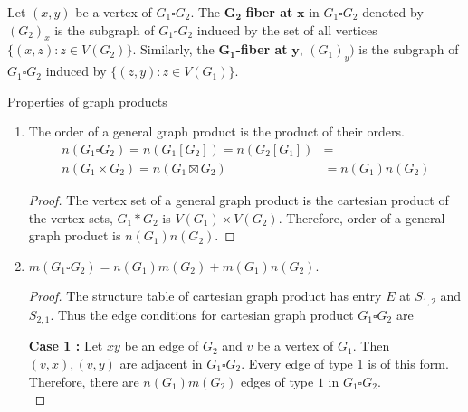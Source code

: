 \begin{definition}
	Let $(x,y)$ be a vertex of $G_1 \square G_2$. The $\mathbf{G_2}$ \textbf{fiber at} $\mathbf{x}$ in $G_1 \square G_2$ denoted by $(G_2)_x$ is the subgraph of $G_1 \square G_2$ induced by the set of all vertices $\{ (x,z) : z \in V(G_2) \}$. Similarly, the $\mathbf{G_1}$\textbf{-fiber at} $\mathbf{y}$, $(G_1)_y)$ is the subgraph of $G_1 \square G_2$ induced by $\{ (z,y) : z \in V(G_1) \}$.
\end{definition}


\begin{exercise}Properties of graph products
\begin{enumerate}
	\item The order of a general graph product is the product of their orders.
	\begin{align*}
		n(G_1 \square G_2) 
		= n(G_1[G_2]) = n(G_2[G_1]) & =\\
		n(G_1 \times G_2) = n(G_1 \boxtimes G_2) & = n(G_1) n(G_2)
		\end{align*}
	\begin{proof}
		The vertex set of a general graph product is the cartesian product of the vertex sets, $G_1 \ast G_2$ is $V(G_1) \times V(G_2)$. Therefore, order of a general graph product is $n(G_1)n(G_2)$.
	\end{proof}
	\item $m(G_1 \square G_2) = n(G_1) m(G_2) + m(G_1) n(G_2)$.
	\begin{proof}
		The structure table of cartesian graph product has entry $E$ at $S_{1,2}$ and $S_{2,1}$.
		Thus the edge conditions for cartesian graph product $G_1 \square G_2$ are

		\textbf{Case 1 :} Let $xy$ be an edge of $G_2$ and $v$ be a vertex of $G_1$. Then $(v,x),(v,y)$ are adjacent in $G_1 \square G_2$. Every edge of type 1 is of this form. Therefore, there are $n(G_1)m(G_2)$ edges of type $1$ in $G_1 \square G_2$.\\


\end{proof}
\end{enumerate}
\end{exercise}
